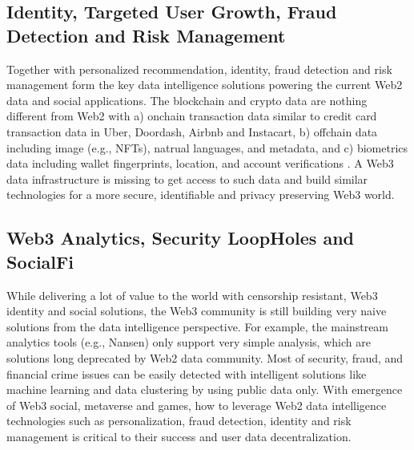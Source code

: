 \documentclass[11pt,letterpaper]{article}
\begin{document}
\subsection{Identity, Targeted User Growth, Fraud Detection and Risk Management}
Together with personalized recommendation, identity, fraud detection and risk management form the key data intelligence solutions powering the current Web2 data and social applications. The blockchain and crypto data are nothing different from Web2 with a) onchain transaction data similar to credit card transaction data in Uber, Doordash, Airbnb and Instacart, b) offchain data including image (e.g., NFTs), natrual languages, and metadata, and c) biometrics data including wallet fingerprints, location, and account verifications \cite{uberfrauddetection,uberhumaninloop,ubermastermind}. A Web3 data infrastructure is missing to get access to such data and build similar technologies for a more secure, identifiable and privacy preserving Web3 world.

\subsection{Web3 Analytics, Security LoopHoles and SocialFi}
While delivering a lot of value to the world with censorship resistant, Web3 identity and social solutions, the Web3 community is still building very naive solutions from the data intelligence perspective. For example, the mainstream analytics tools (e.g., Nansen) only support very simple analysis, which are solutions long deprecated by Web2 data community. Most of security, fraud, and financial crime issues can be easily detected with intelligent solutions like machine learning and data clustering by using public data only. With emergence of Web3 social, metaverse and games, how to leverage Web2 data intelligence technologies such as personalization, fraud detection, identity and risk management is critical to their success and user data decentralization.
\end{document}
